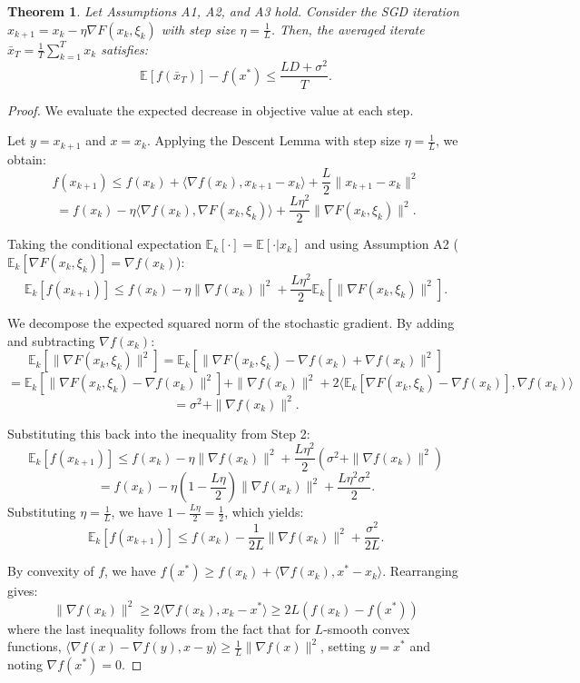 \documentclass[11pt]{article}
\newtheorem{theorem}{Theorem}
\begin{document}
\begin{theorem}
Let Assumptions A1, A2, and A3 hold. Consider the SGD iteration $x_{k+1} = x_k - \eta \nabla F(x_k, \xi_k)$ with step size $\eta = \frac{1}{L}$. Then, the averaged iterate $\bar{x}_T = \frac{1}{T} \sum_{k=1}^T x_k$ satisfies:
\[ \mathbb{E}[f(\bar{x}_T)] - f(x^*) \le \frac{L D + \sigma^2}{T}. \]
\end{theorem}

\begin{proof}
We evaluate the expected decrease in objective value at each step.

Let $y = x_{k+1}$ and $x = x_k$. Applying the Descent Lemma with step size $\eta = \frac{1}{L}$, we obtain:
\[ f(x_{k+1}) \le f(x_k) + \langle \nabla f(x_k), x_{k+1} - x_k \rangle + \frac{L}{2} \|x_{k+1} - x_k\|^2 \]
\[ = f(x_k) - \eta \langle \nabla f(x_k), \nabla F(x_k, \xi_k) \rangle + \frac{L \eta^2}{2} \|\nabla F(x_k, \xi_k)\|^2. \]

Taking the conditional expectation $\mathbb{E}_k[\cdot] = \mathbb{E}[\cdot | x_k]$ and using Assumption A2 ($\mathbb{E}_k[\nabla F(x_k, \xi_k)] = \nabla f(x_k)$):
\[ \mathbb{E}_k[f(x_{k+1})] \le f(x_k) - \eta \|\nabla f(x_k)\|^2 + \frac{L \eta^2}{2} \mathbb{E}_k[\|\nabla F(x_k, \xi_k)\|^2]. \]

We decompose the expected squared norm of the stochastic gradient. By adding and subtracting $\nabla f(x_k)$:
\[ \mathbb{E}_k[\|\nabla F(x_k, \xi_k)\|^2] = \mathbb{E}_k[\|\nabla F(x_k, \xi_k) - \nabla f(x_k) + \nabla f(x_k)\|^2] \]
\[ = \mathbb{E}_k[\|\nabla F(x_k, \xi_k) - \nabla f(x_k)\|^2] + \|\nabla f(x_k)\|^2 + 2\langle \mathbb{E}_k[\nabla F(x_k, \xi_k) - \nabla f(x_k)], \nabla f(x_k) \rangle \]
\[ = \sigma^2 + \|\nabla f(x_k)\|^2. \]

Substituting this back into the inequality from Step 2:
\[ \mathbb{E}_k[f(x_{k+1})] \le f(x_k) - \eta \|\nabla f(x_k)\|^2 + \frac{L \eta^2}{2} (\sigma^2 + \|\nabla f(x_k)\|^2) \]
\[ = f(x_k) - \eta \left(1 - \frac{L \eta}{2}\right) \|\nabla f(x_k)\|^2 + \frac{L \eta^2 \sigma^2}{2}. \]
Substituting $\eta = \frac{1}{L}$, we have $1 - \frac{L \eta}{2} = \frac{1}{2}$, which yields:
\[ \mathbb{E}_k[f(x_{k+1})] \le f(x_k) - \frac{1}{2L} \|\nabla f(x_k)\|^2 + \frac{\sigma^2}{2L}. \]

By convexity of $f$, we have $f(x^*) \ge f(x_k) + \langle \nabla f(x_k), x^* - x_k \rangle$. Rearranging gives:
\[ \|\nabla f(x_k)\|^2 \ge 2 \langle \nabla f(x_k), x_k - x^* \rangle \ge 2L (f(x_k) - f(x^*)) \]
where the last inequality follows from the fact that for $L$-smooth convex functions, $\langle \nabla f(x) - \nabla f(y), x - y \rangle \ge \frac{1}{L} \|\nabla f(x)\|^2$, setting $y=x^*$ and noting $\nabla f(x^*)=0$.


\end{proof}
\end{document}
